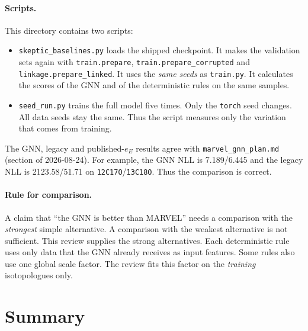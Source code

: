 \documentclass[11pt,a4paper]{article}
\newcommand{\code}[1]{\texttt{#1}}
\begin{document}
\paragraph{Scripts.}
This directory contains two scripts:
\begin{itemize}
\item \code{skeptic\_baselines.py} loads the shipped checkpoint. It makes the
  validation sets again with \code{train.prepare}, \code{train.prepare\_corrupted} and
  \code{linkage.prepare\_linked}. It uses the \emph{same seeds} as \code{train.py}.
  It calculates the scores of the GNN and of the deterministic rules on the same
  samples.
\item \code{seed\_run.py} trains the full model five times. Only the \code{torch}
  seed changes. All data seeds stay the same. Thus the script measures only the
  variation that comes from training.
\end{itemize}
The GNN, legacy and published-$e_E$ results agree with
\code{marvel\_gnn\_plan.md} (section of 2026-08-24). For example, the GNN NLL is
7.189/6.445 and the legacy NLL is 2123.58/51.71 on \code{12C17O}/\code{13C18O}. Thus
the comparison is correct.

\paragraph{Rule for comparison.}
A claim that ``the GNN is better than MARVEL'' needs a comparison with the
\emph{strongest} simple alternative. A comparison with the weakest alternative is not
sufficient. This review supplies the strong alternatives. Each deterministic rule
uses only data that the GNN already receives as input features. Some rules also use
one global scale factor. The review fits this factor on the \emph{training}
isotopologues only.

\section{Summary}
\end{document}
